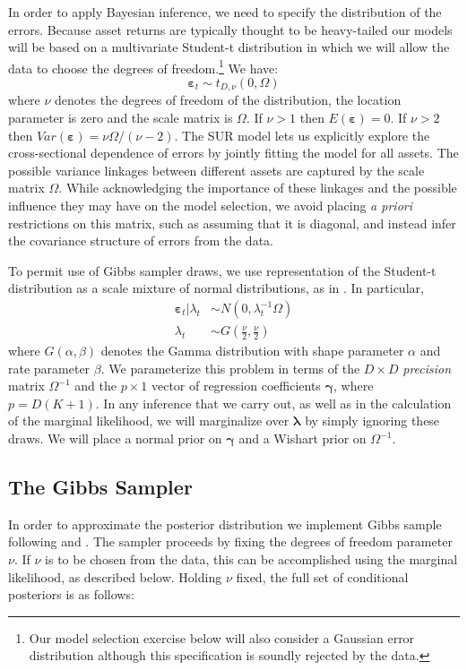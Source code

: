 In order to apply Bayesian inference, we need to specify the distribution of the errors. 
Because asset returns are typically thought to be heavy-tailed our models will be based on a multivariate Student-t distribution in which we will allow the data to choose the degrees of freedom.\footnote{Our model selection exercise below will also consider a Gaussian error distribution although this specification is soundly rejected by the data.}
We have:
\begin{equation*}
\boldsymbol{\varepsilon}_{t}\sim t_{D,\nu }\left( 0,\Omega \right)
\end{equation*}
where $\nu$ denotes the degrees of freedom of the distribution, the location parameter is zero and the scale matrix is $\Omega$.
If $\nu >1$ then $E(\boldsymbol{\varepsilon}) = 0$. 
If $\nu>2$ then $Var\left( \boldsymbol{\varepsilon} \right) = \nu \Omega/(\nu-2)$. 
The SUR model lets us explicitly explore the cross-sectional dependence of errors by jointly fitting the model for all assets. 
The possible variance linkages between different assets are captured by the scale matrix $\Omega$. 
While acknowledging the importance of these linkages and the possible influence they may have on the model selection, we avoid placing \emph{a priori} restrictions on this matrix, such as assuming that it is diagonal, and instead infer the covariance structure of errors from the data.

To permit use of Gibbs sampler draws, we use representation of the Student-t distribution as a scale mixture of normal distributions, as in \cite{chib1995hierarchical}.
In particular,
\begin{eqnarray*}
\boldsymbol{\varepsilon}_{t}|\lambda _{t} &\sim N\left( 0,\lambda _{t}^{-1}\Omega \right)
\\
\lambda _{t} &\sim G\left( \frac{\nu }{2},\frac{\nu }{2}\right)
\end{eqnarray*}
where $G(\alpha,\beta)$ denotes the Gamma distribution with shape parameter $\alpha$ and rate parameter $\beta$. 
We parameterize this problem in terms of the $D\times D$ \emph{precision} matrix $\Omega^{-1}$ and the $p\times1$ vector of regression coefficients $\boldsymbol{\gamma}$, where $p = D(K+1)$. 
In any inference that we carry out, as well as in the calculation of the marginal likelihood, we will marginalize over $\boldsymbol{\lambda}$ by simply ignoring these draws.
We will place a normal prior on $\boldsymbol{\gamma}$ and a Wishart prior on $\Omega^{-1}$. 

\subsection{The Gibbs Sampler}
In order to approximate the posterior distribution we implement Gibbs sample following \cite{chib1996markov} and \cite{carlin1991inference}. The sampler proceeds by fixing the degrees of freedom parameter $\nu$.
If $\nu$ is to be chosen from the data, this can be accomplished using the marginal likelihood, as described below.
Holding $\nu$ fixed, the full set of conditional posteriors is as follows:

